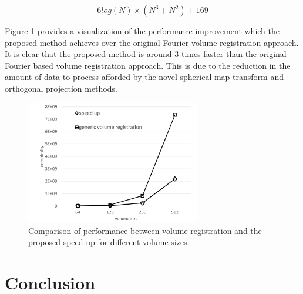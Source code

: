 \begin{equation} \label{eqn:FULLPERF2}
6log(N)\times (N^3 + N^2) + 169
\end{equation}

Figure \ref{fig:perfComp} provides a visualization of the performance improvement which the proposed method achieves over the original Fourier volume registration approach. It is clear that the proposed method is around 3 times faster
than the original Fourier based volume registration approach. This is due to the reduction in the amount of data to process afforded by the novel spherical-map transform and orthogonal projection methods.

\begin{figure}[t]
\centering
\includegraphics[width=3.0in]{images/results/performance/comparison}
\caption{Comparison of performance between volume registration and the proposed speed up for different volume sizes.}
\label{fig:perfComp}
\end{figure}


\section{Conclusion}
